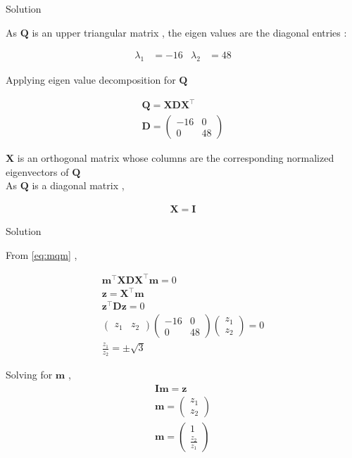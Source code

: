 \documentclass{beamer}
\numberwithin{equation}{section}
\theoremstyle{remark}
\newcommand{\myvec}[1]{\ensuremath{\begin{pmatrix}#1\end{pmatrix}}}
\let\vec\mathbf
\begin{document}
\begin{frame}{Solution}

As $\vec{Q}$ is an upper triangular matrix , the eigen values are the diagonal entries :

\begin{align}
  \lambda_1 &= -16 & \lambda_2 &= 48
\end{align}

Applying eigen value decomposition for $\vec{Q}$ 

\begin{align}
  \vec{Q} = \vec{X}\vec{D}\vec{X}^\top\\
  \vec{D} = \myvec{-16 & 0\\0 & 48}
\end{align}

$\vec{X}$ is an orthogonal matrix whose columns are the corresponding normalized eigenvectors of $\vec{Q}$\\
As $\vec{Q}$ is a diagonal matrix , 

\begin{align}
  \vec{X} = \vec{I}
\end{align}

\end{frame}

\begin{frame}{Solution}

From \eqref{eq:mqm} ,

\begin{align}
  \vec{m}^\top\vec{X}\vec{D}\vec{X}^\top\vec{m} = 0\\
  \vec{z} = \vec{X}^\top\vec{m}\\
  \vec{z}^\top\vec{D}\vec{z} = 0\\
  \myvec{z_1 & z_2}\myvec{-16 & 0\\0 & 48}\myvec{z_1\\z_2} = 0\\
  \frac{z_1}{z_2} = \pm \sqrt{3} \label{eq:z} 
\end{align}

Solving for $\vec{m}$ ,
\begin{align}
  \vec{I}\vec{m} = \vec{z}\\
  \vec{m} = \myvec{z_1\\z_2}\\
  \vec{m} = \myvec{1\\\tfrac{z_2}{z_1}}
\end{align}

\end{frame}
\end{document}
